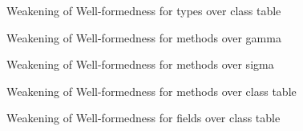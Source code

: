 \documentclass[acmlarge, anonymous, authordraft, review]{acmart} %
\begin{document}
\begin{lemma}{Weakening of Well-formedness for types over class table}{}
  \begin{conds}
    \cond{$\WFtype\K\t$}
  \end{conds}

  \then\axiom{$\WFtype{\K~\Kp}\t$}

\end{lemma}

\begin{lemma}{Weakening of Well-formedness for methods over gamma}{}
  \begin{conds}
    \cond{$\WF\Env\s\K\md$}
  \end{conds}

  \then\axiom{$\WF{\Env~\Envp}\s\K\md$}

\end{lemma}

\begin{lemma}{Weakening of Well-formedness for methods over sigma}{}
  \begin{conds}
    \cond{$\WF\Env\s\K\md$}
  \end{conds}

  \then{}

\end{lemma}

\begin{lemma}{Weakening of Well-formedness for methods over class table}{}
  \begin{conds}
    \cond{$\WF\Env\s\K\md$}
  \end{conds}

  \then\axiom{$\WF\Env\s{\K~\Kp}\md$}

\end{lemma}

\begin{lemma}{Weakening of Well-formedness for fields over class table}{}
  \begin{conds}
    \cond{$\WFtype\K{\Fdef\f\t}$}
  \end{conds}

  \then\axiom{$\WFtype{\K~\Kp}{\Fdef\f\t}$}

\end{lemma}
\end{document}

